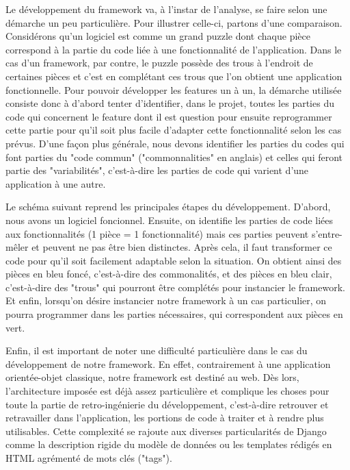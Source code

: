 Le développement du framework va,  à l'instar de l'analyse,  se faire selon une démarche un peu particulière.  Pour illustrer celle-ci,  partons d'une comparaison.  Considérons qu'un logiciel est comme un grand puzzle dont chaque pièce correspond à la partie du code liée à une fonctionnalité de l'application.  Dans le cas d'un framework,  par contre,  le puzzle possède des trous à l'endroit de certaines pièces et c'est en complétant ces trous que l'on obtient une application fonctionnelle.  Pour pouvoir développer les features un à un,  la démarche utilisée consiste donc à d'abord tenter d'identifier,  dans le projet,  toutes les parties du code qui concernent le feature dont il est question pour ensuite reprogrammer cette partie pour qu'il soit plus facile d'adapter cette fonctionnalité selon les cas prévus.  D'une façon plus générale,  nous devons identifier les parties du codes qui font parties du "code commun" ("commonnalities" en anglais) et celles qui feront partie des "variabilités",  c'est-à-dire les parties de code qui varient d'une application à une autre.

Le schéma suivant reprend les principales étapes du développement.  D'abord,  nous avons un logiciel foncionnel.  Ensuite,  on identifie les parties de code liées aux fonctionnalités (1 pièce = 1 fonctionnalité) mais ces parties peuvent s'entre-mêler et peuvent ne pas être bien distinctes.  Après cela,  il faut transformer ce code pour qu'il soit facilement adaptable selon la situation.  On obtient ainsi des pièces en bleu foncé,  c'est-à-dire des commonalités,  et des pièces en bleu clair,  c'est-à-dire des "trous" qui pourront être complétés pour instancier le framework.  Et enfin,  lorsqu'on désire instancier notre framework à un cas particulier,  on pourra programmer dans les parties nécessaires,  qui correspondent aux pièces en vert.

\begin{center}
\end{center}

Enfin,  il est important de noter une difficulté particulière dans le cas du développement de notre framework.  En effet,  contrairement à une application orientée-objet classique,  notre framework est destiné au web.  Dès lors,  l'architecture imposée est déjà assez particulière et complique les choses pour toute la partie de retro-ingénierie du développement,  c'est-à-dire retrouver et retravailler dans l'application,  les portions de code à traiter et à rendre plus utilisables.  Cette complexité se rajoute aux diverses particularités de Django comme la description rigide du modèle de données ou les templates rédigés en HTML agrémenté de mots clés ("tags").

